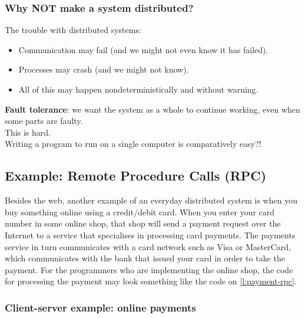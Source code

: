 \begin{frame}
    \label{s:why-not}
    \frametitle{Why NOT make a system distributed?}
    The trouble with distributed systems:
    \begin{itemize}
        \item Communication may fail (and we might not even know it has failed).
        \item Processes may crash (and we might not know).
        \item All of this may happen nondeterministically and without warning.
    \end{itemize}\vspace{1em}\pause
    \textbf{Fault tolerance}: we want the system as a whole to continue working, even when some parts are faulty.\\[1em]
    This is hard.\\[1em]
    Writing a program to run on a single computer is comparatively easy?!
\end{frame}


\subsection{Example: Remote Procedure Calls (RPC)}\label{sec:rpc}

Besides the web, another example of an everyday distributed system is when you buy something online using a credit/debit card.
When you enter your card number in some online shop, that shop will send a payment request over the Internet to a service that specialises in processing card payments.
The payments service in turn communicates with a card network such as Visa or MasterCard, which communicates with the bank that issued your card in order to take the payment.
For the programmers who are implementing the online shop, the code for processing the payment may look something like the code on \autoref{l:payment-rpc}.

\begin{frame}
    \label{s:payment-example}
    \frametitle{Client-server example: online payments}
    \begin{center}
    \end{center}
\end{frame}

